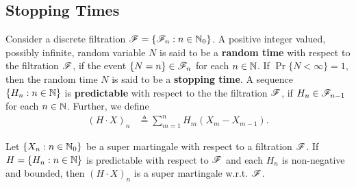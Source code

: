 \documentclass[a4paper,10pt,english]{article}
\begin{document}
\subsection{Stopping Times}
Consider a discrete filtration $\mathscr{F} = \{\mathscr{F}_n: n \in \mathbb{N}_0\}$.  
A positive integer valued, possibly infinite, random variable $N$ is said to be a \textbf{random time} with respect to the 
filtration $\mathscr{F}$,  if the event $\{N=n\} \in \mathscr{F}_n$ for each $n \in \mathbb{N}$. 
If $\Pr\{N < \infty\}=1$, then the random time $N$ is said to be a \textbf{stopping time}. 
A sequence $\{H_n: n\in \mathbb{N}\}$ is \textbf{predictable} with respect to the the filtration $\mathscr{F}$, if $H_n \in \mathscr{F}_{n-1}$ for each $n \in \mathbb{N}$. 
Further, we define 
\begin{align*}
(H\cdot X)_n &\triangleq \sum_{m=1}^{n}H_m(X_m-X_{m-1}).
\end{align*}
\begin{thm}
Let $\{X_n: n \in \mathbb{N}_0\}$ be a super martingale with respect to a filtration $\mathscr{F}$. 
If $H = \{H_n: n \in \mathbb{N}\}$ is predictable with respect to $\mathscr{F}$ and each $H_n$ is non-negative and bounded, 
then $(H \cdot X)_n$ is a super martingale w.r.t. $\mathscr{F}$. 
\end{thm}
\end{document}
